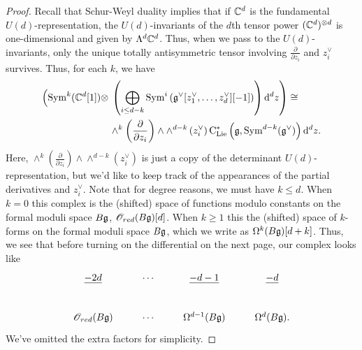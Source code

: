 \begin{proof}
Recall that Schur-Weyl duality  implies that if $\mathbb C^d$ is the fundamental $U(d)$-representation, 
the $U(d)$-invariants of the $d$th tensor power $(\mathbb C^d)^{\otimes d}$ is one-dimensional and given by $\Lambda^d \mathbb C^d$. 
Thus, when we pass to the $U(d)$-invariants, only the unique totally antisymmetric tensor involving $\frac{\partial}{\partial z_i}$ and $z_i^\vee$ survives. 
Thus, for each $k$, we have
\begin{align}
\label{U(d) invariants}
\left({\rm Sym}^k(\mathbb C^d[1]) \otimes \right. & \left. \left(\bigoplus_{i \leq d-k} {\rm Sym}^{i} \left(\mathfrak g^\vee [z_1^\vee,\ldots,z_d^\vee][-1] \right) \right) {\rm d}^d z\right) \cong \\ & \wedge^{k}\left(\frac{\partial}{\partial z_i}\right) \wedge \wedge^{d-k}\left(z_i^\vee\right) {\rm C}_{{\rm Lie}}^*\left(\mathfrak g , {\rm Sym}^{d-k}(\mathfrak g^\vee)\right) {\rm d}^d z .
\end{align}
Here, $\wedge^{k}\left(\frac{\partial}{\partial z_i}\right) \wedge \wedge^{d-k}\left(z_i^\vee\right)$ is just a copy of the determinant $U(d)$-representation, but we'd like to keep track of the appearances of the partial derivatives and $z_i^\vee$. 
Note that for degree reasons, we must have $k \leq d$. 
When $k = 0$ this complex is the (shifted) space of functions modulo constants on the formal moduli space $B\mathfrak g$, $\mathscr O_{red}(B\mathfrak g)[d]$. 
When $k \geq 1$ this the (shifted) space of $k$-forms on the formal moduli space $B\mathfrak g$, which we write as $\Omega^{k}(B \mathfrak g)[d+k]$.
Thus, we see that before turning on the differential on the next page, our complex looks like
\[
\label{bg def complex1}
\xymatrix{
\ul{-2d} & \cdots & \ul{-d-1} & \ul{-d} \\
\sO_{red}(B \fg) & \cdots & \Omega^{d-1} (B \fg) & \Omega^{d}(B \fg) .
}
\]
We've omitted the extra factors for simplicity. 
\end{proof}

